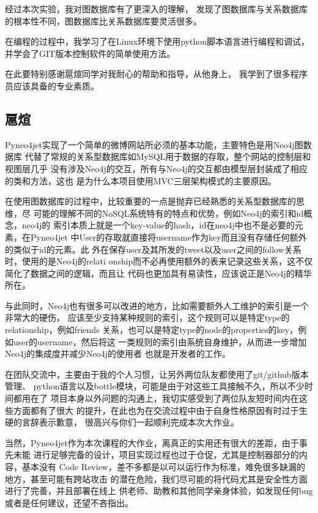 \documentclass{yaldc}
\begin{document}
经过本次实验，我对图数据库有了更深入的理解，
发现了图数据库与关系数据库的根本性不同，图数据库比关系数据库要灵活很多。

在编程的过程中，我学习了在Linux环境下使用python脚本语言进行编程和调试，
并学会了GIT版本控制软件的简单使用方法。

在此要特别感谢扈煊同学对我耐心的帮助和指导，从他身上，
我学到了很多程序员应该具备的专业素质。

\subsection{扈煊}

Pyneo4jet实现了一个简单的微博网站所必须的基本功能，主要特色是用Neo4j图数据库
代替了常规的关系型数据库如MySQL用于数据的存取，整个网站的控制层和视图层几乎
没有涉及Neo4j的交互，所有与Neo4j的交互都由模型层封装成了相应的类和方法，这也
是为什么本项目使用MVC三层架构模式的主要原因。

在使用图数据库的过程中，比较重要的一点是抛弃已经熟悉的关系型数据库的思维，尽
可能的理解不同的NoSQL系统特有的特点和优势，例如Neo4j的索引和id概念，neo4j的
索引本质上就是一个key-value的hash，id在neo4j中也不是必要的元素，在Pyneo4jet
中User的存取就直接将username作为key而且没有存储任何额外的类似于id的元素。此
外在保存user及其所发的tweet以及user之间的follow关系时，使用的是Neo4j的relati
onship而不必再使用额外的表来记录这些关系，这不仅简化了数据之间的逻辑，而且让
代码也更加具有易读性，应该说正是Neo4j的精华所在。

与此同时，Neo4j也有很多可以改进的地方，比如需要额外人工维护的索引是一个非常大的硬伤，
应该至少支持某种规则的索引，这个规则可以是特定type的relationship，例如friends
关系，也可以是特定type的node的properties的key，例如user的username，然后将这
一类规则的索引由系统自身维护，从而进一步增加Neo4j的集成度并减少Neo4j的使用者
也就是开发者的工作。

在团队交流中，主要由于我的个人习惯，让另外两位队友都使用了git/github版本管理、
python语言以及bottle模块，可能是由于对这些工具接触不久，所以不少时间都用在了
项目本身以外问题的沟通上，我切实感受到了两位队友短时间内在这些方面都有了很大
的提升，在此也为在交流过程中由于自身性格原因有时过于生硬的言辞表示歉意，
很高兴与你们一起顺利完成本次大作业。

当然，Pyneo4jet作为本次课程的大作业，离真正的实用还有很大的差距，由于事先未能
进行足够完备的设计，项目实现过程也过于仓促，尤其是控制器部分的内容，基本没有
Code Review，差不多都是以可以运行作为标准，难免很多缺漏的地方，甚至可能有跨站攻击
的潜在危险，我们尽可能的将代码尤其是安全性方面进行了完善，并且部署在线上
供老师、助教和其他同学亲身体验，如发现任何bug或者是任何建议，还望不吝指出。
\end{document}

